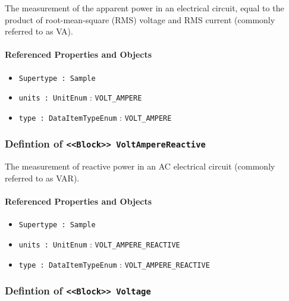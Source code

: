 \FloatBarrier

The measurement of the apparent power in an electrical circuit, equal to the product of root-mean-square (RMS) voltage and RMS current (commonly referred to as VA).

\FloatBarrier
\paragraph{Referenced Properties and Objects}

\begin{itemize}
\item \texttt{Supertype : Sample}

\item \texttt{units : UnitEnum} : \texttt{VOLT_AMPERE}

\item \texttt{type : DataItemTypeEnum} : \texttt{VOLT_AMPERE}

\end{itemize}
\FloatBarrier
\subsubsection{Defintion of \texttt{<<Block>> VoltAmpereReactive}}
  \label{type:VoltAmpereReactive}

\FloatBarrier

The measurement of reactive power in an AC electrical circuit (commonly referred to as VAR).

\FloatBarrier
\paragraph{Referenced Properties and Objects}

\begin{itemize}
\item \texttt{Supertype : Sample}

\item \texttt{units : UnitEnum} : \texttt{VOLT_AMPERE_REACTIVE}

\item \texttt{type : DataItemTypeEnum} : \texttt{VOLT_AMPERE_REACTIVE}

\end{itemize}
\FloatBarrier
\subsubsection{Defintion of \texttt{<<Block>> Voltage}}
  \label{type:Voltage}

